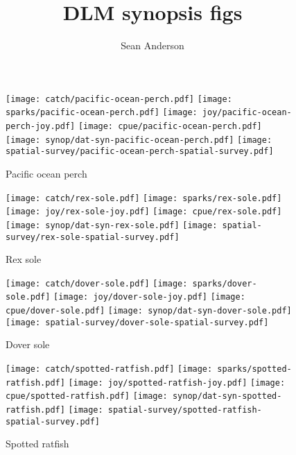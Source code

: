 \documentclass[12pt]{article}
\title{DLM synopsis figs}
\author{Sean Anderson}
\begin{document}

\begin{landscape}

\begin{figure}[htbp]
  \centering
    \texttt{[image: catch/pacific-ocean-perch.pdf]}
    \texttt{[image: sparks/pacific-ocean-perch.pdf]}
    \texttt{[image: joy/pacific-ocean-perch-joy.pdf]}
  \texttt{[image: cpue/pacific-ocean-perch.pdf]}
    \texttt{[image: synop/dat-syn-pacific-ocean-perch.pdf]}
  \texttt{[image: spatial-survey/pacific-ocean-perch-spatial-survey.pdf]}
    \caption{Pacific ocean perch}
\end{figure}

\clearpage 

\begin{figure}[htbp]
  \centering
    \texttt{[image: catch/rex-sole.pdf]}
    \texttt{[image: sparks/rex-sole.pdf]}
    \texttt{[image: joy/rex-sole-joy.pdf]}
  \texttt{[image: cpue/rex-sole.pdf]}
    \texttt{[image: synop/dat-syn-rex-sole.pdf]}
  \texttt{[image: spatial-survey/rex-sole-spatial-survey.pdf]}
    \caption{Rex sole}
\end{figure}

\clearpage 

\begin{figure}[htbp]
  \centering
    \texttt{[image: catch/dover-sole.pdf]}
    \texttt{[image: sparks/dover-sole.pdf]}
    \texttt{[image: joy/dover-sole-joy.pdf]}
  \texttt{[image: cpue/dover-sole.pdf]}
    \texttt{[image: synop/dat-syn-dover-sole.pdf]}
  \texttt{[image: spatial-survey/dover-sole-spatial-survey.pdf]}
    \caption{Dover sole}
\end{figure}

\begin{figure}[htbp]
  \centering
    \texttt{[image: catch/spotted-ratfish.pdf]}
    \texttt{[image: sparks/spotted-ratfish.pdf]}
    \texttt{[image: joy/spotted-ratfish-joy.pdf]}
  \texttt{[image: cpue/spotted-ratfish.pdf]}
    \texttt{[image: synop/dat-syn-spotted-ratfish.pdf]}
  \texttt{[image: spatial-survey/spotted-ratfish-spatial-survey.pdf]}
    \caption{Spotted ratfish}
\end{figure}


\end{landscape}
\end{document}
